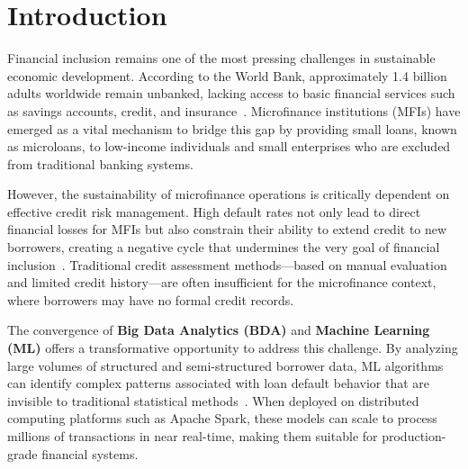 \documentclass[preprint,12pt,authoryear]{elsarticle}
\begin{document}

\section{Introduction}
\label{sec:introduction}

Financial inclusion remains one of the most pressing challenges in sustainable economic development. According to the World Bank, approximately 1.4 billion adults worldwide remain unbanked, lacking access to basic financial services such as savings accounts, credit, and insurance~\cite{chen2014bigdata}. Microfinance institutions (MFIs) have emerged as a vital mechanism to bridge this gap by providing small loans, known as microloans, to low-income individuals and small enterprises who are excluded from traditional banking systems.

However, the sustainability of microfinance operations is critically dependent on effective credit risk management. High default rates not only lead to direct financial losses for MFIs but also constrain their ability to extend credit to new borrowers, creating a negative cycle that undermines the very goal of financial inclusion~\cite{bazarbash2019financial}. Traditional credit assessment methods---based on manual evaluation and limited credit history---are often insufficient for the microfinance context, where borrowers may have no formal credit records.

The convergence of \textbf{Big Data Analytics (BDA)} and \textbf{Machine Learning (ML)} offers a transformative opportunity to address this challenge. By analyzing large volumes of structured and semi-structured borrower data, ML algorithms can identify complex patterns associated with loan default behavior that are invisible to traditional statistical methods~\cite{khandani2010ml}. When deployed on distributed computing platforms such as Apache Spark, these models can scale to process millions of transactions in near real-time, making them suitable for production-grade financial systems.
\end{document}

